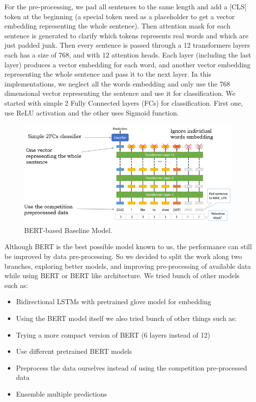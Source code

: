 \documentclass[10pt,twocolumn,letterpaper]{article}
\begin{document}
For the pre-processing, we pad all sentences to the same length and add a [CLS] token at the beginning (a special token used as a placeholder to get a vector embedding representing the whole sentence). Then attention mask for each sentence is generated to clarify which tokens represents real words and which are just padded junk. Then every sentence is passed through a 12 transformers layers each has a size of 768, and with 12 attention heads. Each layer (including the last layer) produces a vector embedding for each word, and another vector embedding representing the whole sentence and pass it to the next layer. In this implementations, we neglect all the words embedding and only use the 768 dimensional vector representing the sentence and use it for classification. We started with simple 2 Fully Connected layers (FCs) for classification. First one, use ReLU activation and the other uses Sigmoid function. 

\begin{figure}[htbp]
\centerline{\includegraphics[width=0.999\columnwidth]{Figures/BERTbasedModel.png}}
\caption{BERT-based Baseline Model.}
\label{BERTbasedModel}
\end{figure}

Although BERT is the best possible model known to us, the performance can still be improved by data pre-processing.
So we decided to split the work along two branches, exploring better models, and improving pre-processing of available data while using BERT or BERT like architecture.
We tried bunch of other models such as:
\begin{itemize}
\item Bidirectional LSTMs with pretrained glove model for embedding
\item Using the BERT model itself we also tried bunch of other things such as:
\item Trying a more compact version of BERT (6 layers instead of 12) 
\item Use different pretrained BERT models 
\item Preprocess the data ourselves instead of using the competition pre-processed data
\item Ensemble multiple predictions
\end{itemize}
\end{document}
